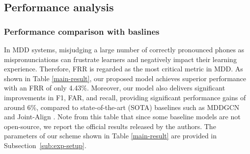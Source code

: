 \documentclass{article}
\begin{document}
\subsection{Performance analysis}
\subsubsection{Performance comparison with baslines}
In MDD systems, misjudging a large number of correctly pronounced phones as mispronunciations can frustrate learners and negatively impact their learning experience. Therefore, FRR is regarded as the most critical metric in MDD. As shown in Table \ref{main-result}, our proposed model achieves superior performance with an FRR of only 4.43\%. Moreover, our model also delivers significant improvements in F1, FAR, and recall, providing significant performance gains of around 6\%, compared to state-of-the-art (SOTA) baselines such as MDDGCN \cite{gcnmdd} and Joint-Align \cite{joint-align}. Note from this table that since some baseline models are not open-source, we report the official results released by the authors. The parameters of our scheme shown in Table \ref{main-result} are provided in Subsection~\ref{sub:exp-setup}.
\end{document}
